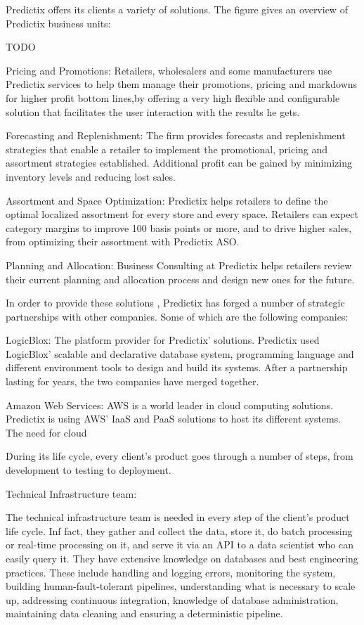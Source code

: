 Predictix offers its clients a variety of solutions. The figure gives an
overview of Predictix business units:

TODO

Pricing and Promotions: Retailers, wholesalers and some manufacturers use
Predictix services to help them manage their promotions, pricing and markdowns
for higher profit bottom lines,by offering a very high flexible and
configurable solution that facilitates the user interaction with the results he
gets.

Forecasting  and Replenishment: The firm provides forecasts and replenishment
strategies that enable a retailer to implement the promotional, pricing and
assortment strategies established. Additional profit can be gained by minimizing
inventory levels and reducing lost sales.

Assortment and Space Optimization: Predictix helps retailers to define the
optimal localized assortment for every store and every space. Retailers can
expect category margins to improve 100 basis points or more, and to drive higher
sales, from optimizing their assortment with Predictix ASO.

Planning and  Allocation: Business Consulting at Predictix helps retailers
review their current planning and allocation process and design  new ones for
the future.

In order to provide these solutions , Predictix has forged a number of
strategic partnerships with other companies. Some of which are the following
companies:

LogicBlox: The platform provider for Predictix' solutions. Predictix used
LogicBlox' scalable and declarative database system, programming language and
different environment tools to design and build  its systems. After a
partnership lasting for years, the two companies have merged together.

Amazon Web Services: AWS is a world leader in cloud computing solutions.
Predictix is using AWS' IaaS and PaaS solutions to host its different systems.
The need for cloud

During its life cycle, every client's product goes through a number of steps,
from development to testing to deployment. 

Technical Infrastructure team:

The technical infrastructure team is needed in every step of the client's
product life cycle. Inf  fact, they gather and collect the data, store it, do
batch processing or real-time processing on it, and serve it via an API to a data
scientist who can easily query it. They have extensive knowledge on databases
and best engineering practices. These include handling and logging errors,
monitoring the system, building human-fault-tolerant pipelines, understanding
what is necessary to scale up, addressing continuous integration, knowledge of
database administration, maintaining data cleaning and ensuring a deterministic
pipeline.

